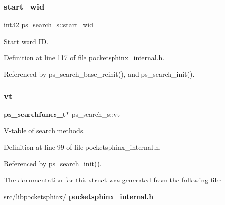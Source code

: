 \subsubsection{start\+\_\+wid}
{\footnotesize\ttfamily int32 ps\+\_\+search\+\_\+s\+::start\+\_\+wid}



Start word ID. 



Definition at line 117 of file pocketsphinx\+\_\+internal.\+h.



Referenced by ps\+\_\+search\+\_\+base\+\_\+reinit(), and ps\+\_\+search\+\_\+init().

\mbox{\label{structps__search__s_aa51e88956bbe9c05359d32526180809b}} 
\subsubsection{vt}
{\footnotesize\ttfamily \textbf{ ps\+\_\+searchfuncs\+\_\+t}$\ast$ ps\+\_\+search\+\_\+s\+::vt}



V-\/table of search methods. 



Definition at line 99 of file pocketsphinx\+\_\+internal.\+h.



Referenced by ps\+\_\+search\+\_\+init().



The documentation for this struct was generated from the following file\+:\begin{DoxyCompactItemize}
\item 
src/libpocketsphinx/\textbf{ pocketsphinx\+\_\+internal.\+h}\end{DoxyCompactItemize}

